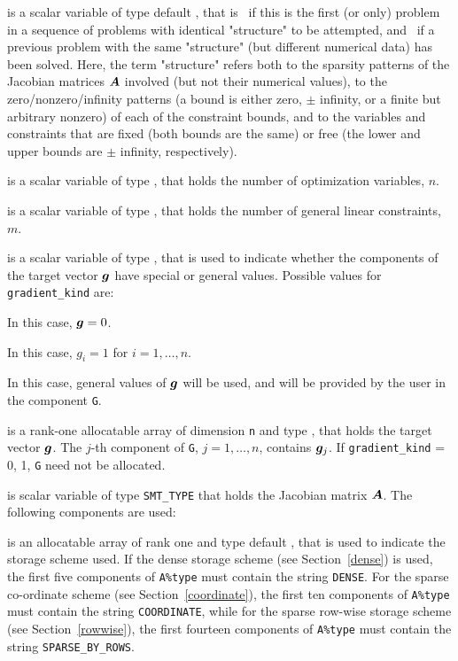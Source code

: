 \documentclass{galahad}
\begin{document}
\begin{description}

 is a scalar variable of type default \logical, 
 that is \true\ if this is the first (or only) problem in a sequence of 
 problems with identical "structure" to be attempted, and \false\ if 
 a previous problem with the same "structure" (but different
 numerical data) has been solved. Here, the term "structure" refers both to 
 the sparsity patterns of the Jacobian matrices ${\bm{A}}$ involved 
 (but not their numerical values), to the zero/nonzero/infinity patterns 
 (a bound is either zero, $\pm$ infinity, or a finite but arbitrary 
 nonzero) of each of the constraint bounds, and to the variables and constraints
 that are fixed (both bounds are the same) or free (the lower and upper
 bounds are $\pm$ infinity, respectively).

 is a scalar variable of type \integer, 
 that holds the number of optimization variables, $n$.  
              
 is a scalar variable of type \integer, 
 that holds the number of general linear constraints, $m$.
              
 is a scalar variable of type \integer, 
that is used to indicate whether the components of the target vector ${\bm{g}}$ 
have special or general values. Possible values for {\tt gradient\_kind} are:
\begin{description}
  In this case, ${\bm{g}} = 0$.

 In this case, $g_{i} = 1$ for $i = 1, \ldots ,n$.

 In this case, general values of ${\bm{g}}$ will be used,
     and will be provided by the user in the component {\tt G}.
\end{description}

 is a rank-one allocatable array of dimension {\tt n} and type 
\realdp, that holds the target vector ${\bm{g}}$.
The $j$-th component of 
{\tt G}, $j = 1,  \ldots ,  n$, contains ${\bm{g}}_{j}$.
If {\tt gradient\_kind} {= 0, 1}, {\tt G} need not be allocated.

 is scalar variable of type {\tt SMT\_TYPE} 
that holds the Jacobian matrix ${\bm{A}}$. The following components are used:

\begin{description}

 is an allocatable array of rank one and type default \character, that
is used to indicate the storage scheme used. If the dense storage scheme 
(see Section~\ref{dense}) is used, 
the first five components of {\tt A\%type} must contain the
string {\tt DENSE}.
For the sparse co-ordinate scheme (see Section~\ref{coordinate}), 
the first ten components of {\tt A\%type} must contain the
string {\tt COORDINATE}, while 
for the sparse row-wise storage scheme (see Section~\ref{rowwise}),
the first fourteen components of {\tt A\%type} must contain the
string {\tt SPARSE\_BY\_ROWS}.


\end{description}
\end{description}
\end{document}
